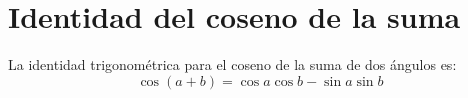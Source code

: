 \section{Identidad del coseno de la suma}\label{sec:identidad}
La identidad trigonométrica para el coseno de la suma de dos ángulos es:
\begin{equation*}
\cos(a + b) = \cos a \cos b - \sin a \sin b
\end{equation*}
